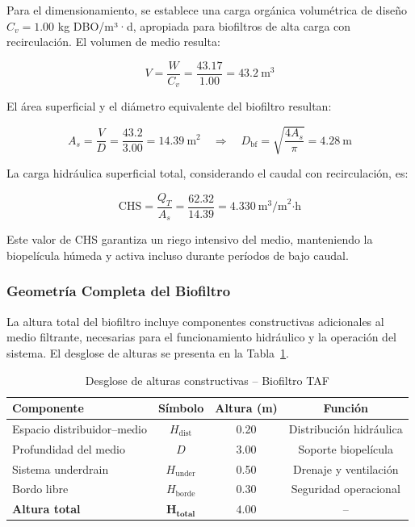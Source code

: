 \documentclass[12pt,a4paper]{article}
\begin{document}
Para el dimensionamiento, se establece una carga orgánica volumétrica de diseño $C_v = 1.00$ kg DBO/m³·d, apropiada para biofiltros de alta carga con recirculación. El volumen de medio resulta:

\begin{equation}
V = \frac{W}{C_v} = \frac{43.17}{1.00} = 43.2\ \text{m}^3
\end{equation}

El área superficial y el diámetro equivalente del biofiltro resultan:

\begin{equation}
A_s = \frac{V}{D} = \frac{43.2}{3.00} = 14.39\ \text{m}^2 \quad \Rightarrow \quad D_{\text{bf}} = \sqrt{\frac{4A_s}{\pi}} = 4.28\ \text{m}
\end{equation}

La carga hidráulica superficial total, considerando el caudal con recirculación, es:

\begin{equation}
\text{CHS} = \frac{Q_T}{A_s} = \frac{62.32}{14.39} = 4.330\ \text{m}^3\text{/m}^2\text{·h}
\end{equation}

Este valor de CHS garantiza un riego intensivo del medio, manteniendo la biopelícula húmeda y activa incluso durante períodos de bajo caudal.

\subsubsection*{Geometría Completa del Biofiltro}

La altura total del biofiltro incluye componentes constructivas adicionales al medio filtrante, necesarias para el funcionamiento hidráulico y la operación del sistema. El desglose de alturas se presenta en la Tabla~\ref{tab:alturas_taf}.

\begin{table}[H]
\centering
\caption{Desglose de alturas constructivas -- Biofiltro TAF}
\label{tab:alturas_taf}
\begin{tabular}{lccc}
\toprule
\textbf{Componente} & \textbf{Símbolo} & \textbf{Altura (m)} & \textbf{Función} \\
\midrule
Espacio distribuidor--medio & $H_{\text{dist}}$ & 0.20 & Distribución hidráulica \\
Profundidad del medio & $D$ & 3.00 & Soporte biopelícula \\
Sistema underdrain & $H_{\text{under}}$ & 0.50 & Drenaje y ventilación \\
Bordo libre & $H_{\text{borde}}$ & 0.30 & Seguridad operacional \\
\midrule
\textbf{Altura total} & $\mathbf{H_{\text{total}}}$ & $\mathbf{4.00}$ & -- \\
\bottomrule
\end{tabular}
\end{table}
\end{document}
